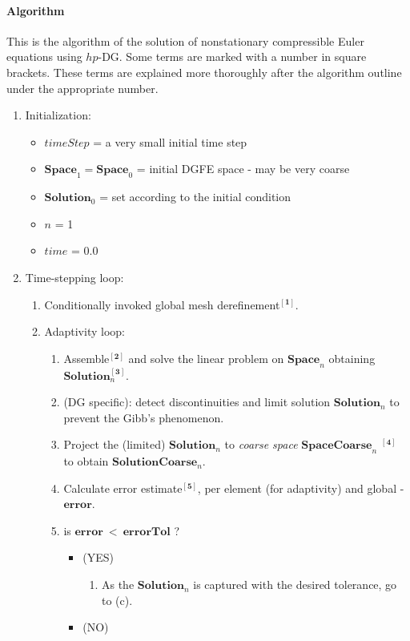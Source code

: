 \paragraph{Algorithm}
This is the algorithm of the solution of nonstationary compressible Euler equations using $hp$-DG. Some terms are marked with a number in square brackets. These terms are explained more thoroughly after the algorithm outline under the appropriate number.
\begin{enumerate}
\item
Initialization:
\begin{itemize}
\item $timeStep$ = a very small initial time step
\item $\mathbf{Space}_1 = \mathbf{Space}_0$ = initial DGFE space - may be very coarse
\item $\mathbf{Solution}_0$ = set according to the initial condition
\item $n$ = 1
\item $time$ = 0.0
\end{itemize}
\item Time-stepping loop:
\begin{enumerate}
\item  Conditionally invoked global mesh derefinement$^{\mathbf{[1]}}$.
\item  Adaptivity loop:
\begin{enumerate}
\item  Assemble$^{\mathbf{[2]}}$ and solve the linear problem on $\mathbf{Space}_n$ obtaining $\mathbf{Solution}_n^{\mathbf{[3]}}$.
\item  (DG specific): detect discontinuities and limit solution $\mathbf{Solution}_n$ to prevent the Gibb's phenomenon.
\item  Project the (limited) $\mathbf{Solution}_n$ to \emph{coarse space} $\mathbf{SpaceCoarse}_n$ $^{\mathbf{[4]}}$ to obtain $\mathbf{SolutionCoarse}_n$.
\item  Calculate error estimate$^{\mathbf{[5]}}$, per element (for adaptivity) and global - $\mathbf{error}$.
\item  is $\mathbf{error}\ <\ \mathbf{errorTol}$ ?
\begin{itemize}
\item (YES)  \begin{enumerate}
\item  As the $\mathbf{Solution}_n$ is captured with the desired tolerance, go to (c).
\end{enumerate}
\item (NO) \begin{enumerate}

\end{enumerate}
\end{itemize}
\end{enumerate}
\end{enumerate}
\end{enumerate}
